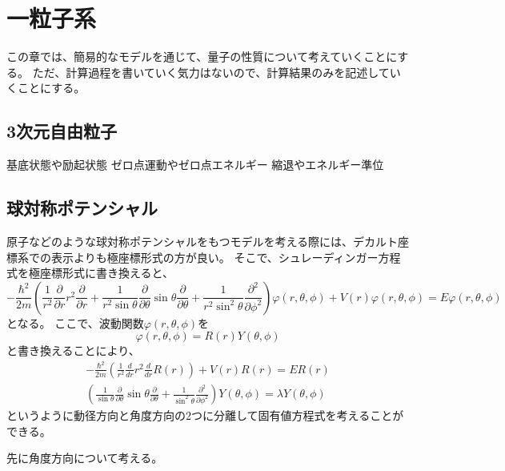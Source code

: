 \documentclass[a4paper]{jsreport}
\begin{document}
    \chapter{一粒子系}
        この章では、簡易的なモデルを通じて、量子の性質について考えていくことにする。
        ただ、計算過程を書いていく気力はないので、計算結果のみを記述していくことにする。
        \section{3次元自由粒子}
            基底状態や励起状態
            ゼロ点運動やゼロ点エネルギー
            縮退やエネルギー準位

        \section{球対称ポテンシャル}
            原子などのような球対称ポテンシャルをもつモデルを考える際には、デカルト座標系での表示よりも極座標形式の方が良い。
            そこで、シュレーディンガー方程式を極座標形式に書き換えると、
            \begin{equation}
                -\frac{\hbar^2}{2m} \left( \frac{1}{r^2} \frac{\partial}{\partial r} r^2 \frac{\partial}{\partial r} + \frac{1}{r^2 \sin \theta} \frac{\partial}{\partial \theta} \sin \theta \frac{\partial}{\partial \theta} + \frac{1}{r^2 \sin^2 \theta} \frac{\partial^2}{\partial \phi^2} \right) \varphi(r, \theta, \phi) + V(r) \varphi(r, \theta, \phi) = E \varphi(r, \theta, \phi)
            \end{equation}
            となる。
            ここで、波動関数$\varphi(r, \theta, \phi)$を
            \begin{equation}
                \varphi(r, \theta, \phi) = R(r) Y(\theta, \phi)
            \end{equation}
            と書き換えることにより、
            \begin{align}
                -\frac{\hbar^2}{2m} \left( \frac{1}{r^2} \frac{d}{dr} r^2 \frac{d}{dr} R(r) \right) + V(r) R(r) = E R(r) \\
                \left( \frac{1}{\sin \theta} \frac{\partial}{\partial \theta} \sin \theta \frac{\partial}{\partial \theta} + \frac{1}{\sin^2 \theta} \frac{\partial^2}{\partial\phi^2} \right) Y(\theta, \phi) = \lambda Y(\theta, \phi)
            \end{align}
            というように動径方向と角度方向の2つに分離して固有値方程式を考えることができる。\par
            先に角度方向について考える。
\end{document}
